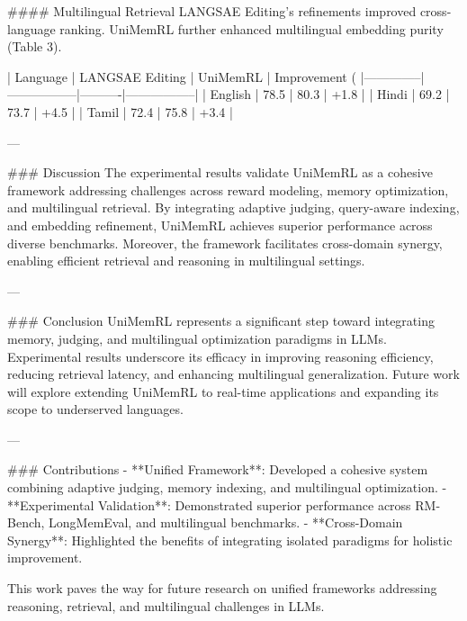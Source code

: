 #### Multilingual Retrieval  
LANGSAE Editing’s refinements improved cross-language ranking. UniMemRL further enhanced multilingual embedding purity (Table 3).  

| Language     | LANGSAE Editing | UniMemRL | Improvement (%
|--------------|-----------------|----------|-----------------|  
| English      | 78.5            | 80.3     | +1.8            |  
| Hindi        | 69.2            | 73.7     | +4.5            |  
| Tamil        | 72.4            | 75.8     | +3.4            |  

---

### Discussion  
The experimental results validate UniMemRL as a cohesive framework addressing challenges across reward modeling, memory optimization, and multilingual retrieval. By integrating adaptive judging, query-aware indexing, and embedding refinement, UniMemRL achieves superior performance across diverse benchmarks. Moreover, the framework facilitates cross-domain synergy, enabling efficient retrieval and reasoning in multilingual settings.  

---

### Conclusion  
UniMemRL represents a significant step toward integrating memory, judging, and multilingual optimization paradigms in LLMs. Experimental results underscore its efficacy in improving reasoning efficiency, reducing retrieval latency, and enhancing multilingual generalization. Future work will explore extending UniMemRL to real-time applications and expanding its scope to underserved languages.  

---

### Contributions  
- **Unified Framework**: Developed a cohesive system combining adaptive judging, memory indexing, and multilingual optimization.  
- **Experimental Validation**: Demonstrated superior performance across RM-Bench, LongMemEval, and multilingual benchmarks.  
- **Cross-Domain Synergy**: Highlighted the benefits of integrating isolated paradigms for holistic improvement.  

This work paves the way for future research on unified frameworks addressing reasoning, retrieval, and multilingual challenges in LLMs.  